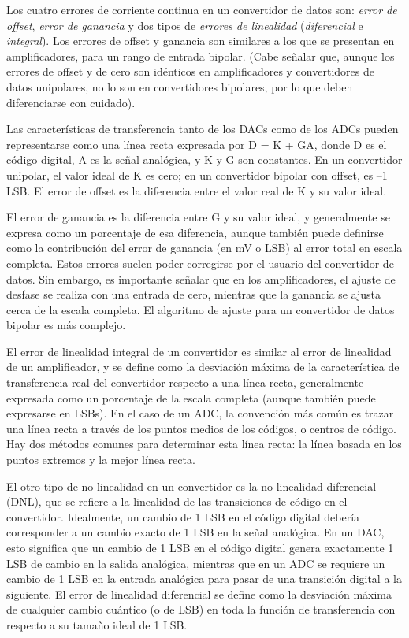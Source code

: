    Los cuatro errores de corriente continua en un convertidor de datos son: \textit{error de offset}, \textit{error de ganancia} y dos tipos de \textit{errores de linealidad} (\textit{diferencial} e \textit{integral}). Los errores de offset y ganancia son similares a los que se presentan en amplificadores, para un rango de entrada bipolar. (Cabe señalar que, aunque los errores de offset y de cero son idénticos en amplificadores y convertidores de datos unipolares, no lo son en convertidores bipolares, por lo que deben diferenciarse con cuidado).

    Las características de transferencia tanto de los DACs como de los ADCs pueden representarse como una línea recta expresada por D = K + GA, donde D es el código digital, A es la señal analógica, y K y G son constantes. En un convertidor unipolar, el valor ideal de K es cero; en un convertidor bipolar con offset, es –1 LSB. El error de offset es la diferencia entre el valor real de K y su valor ideal.

    El error de ganancia es la diferencia entre G y su valor ideal, y generalmente se expresa como un porcentaje de esa diferencia, aunque también puede definirse como la contribución del error de ganancia (en mV o LSB) al error total en escala completa. Estos errores suelen poder corregirse por el usuario del convertidor de datos. Sin embargo, es importante señalar que en los amplificadores, el ajuste de desfase se realiza con una entrada de cero, mientras que la ganancia se ajusta cerca de la escala completa. El algoritmo de ajuste para un convertidor de datos bipolar es más complejo.

    El error de linealidad integral de un convertidor es similar al error de linealidad de un amplificador, y se define como la desviación máxima de la característica de transferencia real del convertidor respecto a una línea recta, generalmente expresada como un porcentaje de la escala completa (aunque también puede expresarse en LSBs). En el caso de un ADC, la convención más común es trazar una línea recta a través de los puntos medios de los códigos, o centros de código. Hay dos métodos comunes para determinar esta línea recta: la línea basada en los puntos extremos y la mejor línea recta.

    El otro tipo de no linealidad en un convertidor es la no linealidad diferencial (DNL), que se refiere a la linealidad de las transiciones de código en el convertidor. Idealmente, un cambio de 1 LSB en el código digital debería corresponder a un cambio exacto de 1 LSB en la señal analógica. En un DAC, esto significa que un cambio de 1 LSB en el código digital genera exactamente 1 LSB de cambio en la salida analógica, mientras que en un ADC se requiere un cambio de 1 LSB en la entrada analógica para pasar de una transición digital a la siguiente. El error de linealidad diferencial se define como la desviación máxima de cualquier cambio cuántico (o de LSB) en toda la función de transferencia con respecto a su tamaño ideal de 1 LSB.

